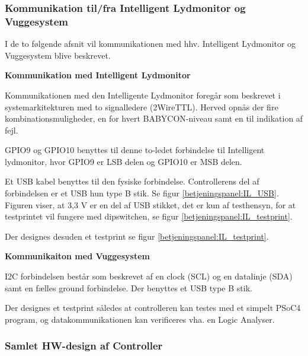\subsubsection*{Kommunikation til/fra Intelligent Lydmonitor og Vuggesystem}

I de to følgende afsnit vil kommunikationen med hhv. Intelligent Lydmonitor og Vuggesystem blive beskrevet.

\textbf{Kommunikation med Intelligent Lydmonitor}

Kommunikationen med den Intelligente Lydmonitor foregår som beskrevet i systemarkitekturen med to signalledere (2WireTTL). Herved opnås der fire kombinationsmuligheder, en for hvert BABYCON-niveau samt en til indikation  af fejl.

GPIO9 og GPIO10 benyttes til denne to-ledet forbindelse til Intelligent lydmonitor, hvor GPIO9 er LSB delen og GPIO10 er MSB delen. 

Et USB kabel benyttes til den fysiske forbindelse.
Controllerens del af forbindelsen er et USB hun type B stik. Se figur \ref{betjeningspanel:IL_USB}. Figuren viser, at 3,3 V er en del af USB stikket, det er kun af testhensyn, for at testprintet vil fungere med dipswitchen, se figur \ref{betjeningspanel:IL_testprint}.

 
Der designes desuden et testprint se figur  \ref{betjeningspanel:IL_testprint}.


\textbf{Kommunikaiton med Vuggesystem}

I2C forbindelsen består som beskrevet af en clock (SCL) og en datalinje (SDA) samt en fælles ground forbindelse. Der benyttes et USB type B stik.


Der designes et testprint således at controlleren kan testes med et simpelt PSoC4 program, og datakommunikationen kan verificeres vha. en Logic Analyser.


\subsubsection*{Samlet HW-design af Controller}

